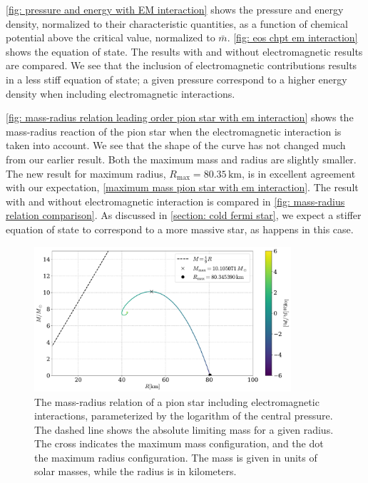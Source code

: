 \autoref{fig: pressure and energy with EM interaction} shows the pressure and energy density, normalized to their characteristic quantities, as a function of chemical potential above the critical value, normalized to $\bar m$.
\autoref{fig: eos chpt em interaction} shows the equation of state.
The results with and without electromagnetic results are compared.
We see that the inclusion of electromagnetic contributions results in a less stiff equation of state; a given pressure correspond to a higher energy density when including electromagnetic interactions.

\autoref{fig: mass-radius relation leading order pion star with em interaction} shows the mass-radius reaction of the pion star when the electromagnetic interaction is taken into account.
We see that the shape of the curve has not changed much from our earlier result. 
Both the maximum mass and radius are slightly smaller.
The new result for maximum radius, $R_\text{max} = 80.35 \, \text{km}$, is in excellent agreement with our expectation, \autoref{maximum mass pion star with em interaction}.
The result with and without electromagnetic interaction is compared in \autoref{fig: mass-radius relation comparison}.
As discussed in \autoref{section: cold fermi star}, we expect a stiffer equation of state to correspond to a more massive star, as happens in this case.

\begin{figure}[!htb]
    \centering
    \includegraphics[width=0.85\textwidth]{../scripts/figurer/pion_star/mass_radius_pion_star_EM.pdf}
    \caption{
        The mass-radius relation of a pion star including electromagnetic interactions, parameterized by the logarithm of the central pressure.
        The dashed line shows the absolute limiting mass for a given radius.
        The cross indicates the maximum mass configuration, and the dot the maximum radius configuration.
        The mass is given in units of solar masses, while the radius is in kilometers.
        }
    \label{fig: mass-radius relation leading order pion star with em interaction}
\end{figure}


